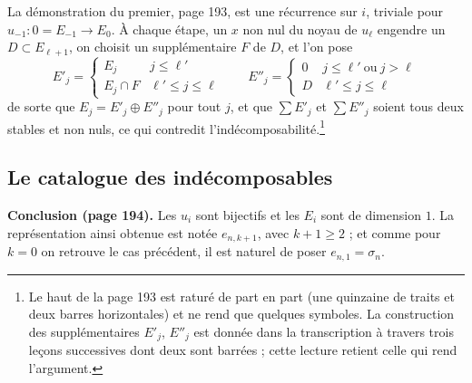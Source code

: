 \documentclass[11pt,a4paper]{article}
\begin{document}
La démonstration du premier, page 193, est une récurrence sur $i$, triviale
pour $u_{-1} \colon 0 = E_{-1} \to E_{0}$. À chaque étape,
un $x$ non nul du noyau de $u_{\ell}$ engendre un $D \subset E_{\ell+1}$, on
choisit un supplémentaire $F$ de $D$, et l'on pose
\[
E'_{j} = \begin{cases}
E_{j} & j \leqslant \ell' \\
E_{j} \cap F & \ell' \leqslant j \leqslant \ell
\end{cases}
\qquad
E''_{j} = \begin{cases}
0 & j \leqslant \ell' \ \text{ou} \ j > \ell \\
D & \ell' \leqslant j \leqslant \ell
\end{cases}
\]
de sorte que $E_{j} = E'_{j} \oplus E''_{j}$ pour tout $j$, et que $\sum E'_{j}$
et $\sum E''_{j}$ soient tous deux stables et non nuls, ce qui contredit
l'indécomposabilité.\footnote{Le haut de la page 193 est raturé de part en part
(une quinzaine de traits et deux barres horizontales) et ne rend que
quelques symboles. La construction des supplémentaires $E'_{j}$, $E''_{j}$ est
donnée dans la transcription à travers trois leçons successives dont deux sont
barrées ; cette lecture retient celle qui rend l'argument.}

\subsection*{Le catalogue des indécomposables}

\textbf{Conclusion (page 194).} Les $u_{i}$ sont bijectifs et les $E_{i}$ sont
de dimension $1$. La représentation ainsi obtenue est notée $e_{n,k+1}$, avec
$k+1 \geqslant 2$ ; et comme pour $k = 0$ on retrouve le cas précédent, il est
naturel de poser $e_{n,1} = \sigma_{n}$.
\end{document}
